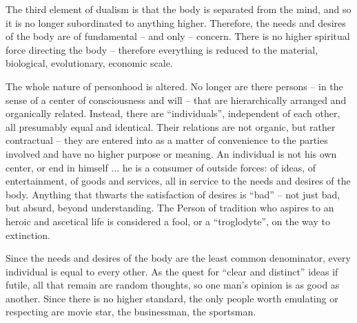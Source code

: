 The third element of dualism is that the body is separated from the mind, and so it is no longer subordinated to anything higher. Therefore, the needs and desires of the body are of fundamental – and only – concern. There is no higher spiritual force directing the body – therefore everything is reduced to the material, biological, evolutionary, economic scale.

The whole nature of personhood is altered. No longer are there persons – in the sense of a center of consciousness and will – that are hierarchically arranged and organically related. Instead, there are “individuals”, independent of each other, all presumably equal and identical. Their relations are not organic, but rather contractual – they are entered into as a matter of convenience to the parties involved and have no higher purpose or meaning. An individual is not his own center, or end in himself ... he is a consumer of outside forces: of ideas, of entertainment, of goods and services, all in service to the needs and desires of the body. Anything that thwarts the satisfaction of desires is “bad” – not just bad, but absurd, beyond understanding. The Person of tradition who aspires to an heroic and ascetical life is considered a fool, or a “troglodyte”, on the way to extinction.

Since the needs and desires of the body are the least common denominator, every individual is equal to every other. As the quest for “clear and distinct” ideas if futile, all that remain are random thoughts, so one man's opinion is as good as another. Since there is no higher standard, the only people worth emulating or respecting are movie star, the businessman, the sportsman.
